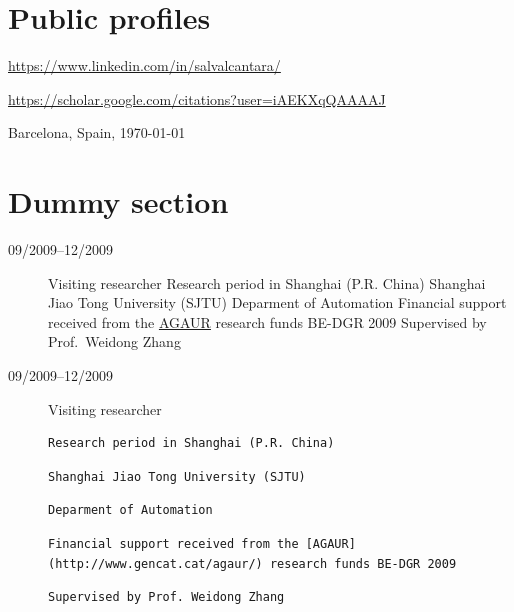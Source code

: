\documentclass[a4paper]{article}
\begin{document}
\section{Public profiles}
\begin{flushleft}
  \url{https://www.linkedin.com/in/salvalcantara/}
\end{flushleft}
\begin{flushleft}
  \url{https://scholar.google.com/citations?user=iAEKXqQAAAAJ}
\end{flushleft}
\begin{flushright}
\vspace{2\baselineskip} \noindent Barcelona, Spain, \today
\end{flushright}


\section{Dummy section}\label{dummy-section}

\begin{description}
\item[09/2009--12/2009]
Visiting researcher\newline
 Research period in Shanghai (P.R. China)\newline
 Shanghai Jiao Tong University (SJTU)\newline
 Deparment of Automation\newline
 Financial support received from the
\href{http://www.gencat.cat/agaur/}{AGAUR} research funds BE-DGR
2009\newline
 Supervised by Prof.~Weidong Zhang\newline
\item[09/2009--12/2009]
Visiting researcher\newline

\begin{verbatim}
Research period in Shanghai (P.R. China)
\end{verbatim}

\begin{verbatim}
Shanghai Jiao Tong University (SJTU)
\end{verbatim}

\begin{verbatim}
Deparment of Automation
\end{verbatim}

\begin{verbatim}
Financial support received from the [AGAUR](http://www.gencat.cat/agaur/) research funds BE-DGR 2009
\end{verbatim}

\begin{verbatim}
Supervised by Prof. Weidong Zhang
\end{verbatim}
\end{description}
\end{document}
